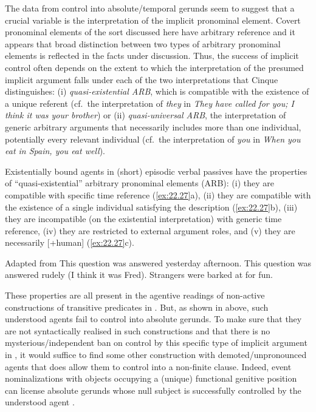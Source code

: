 \documentclass[output=paper]{langsci/langscibook}
\begin{document}
The data from control into absolute/temporal gerunds seem to suggest that a
crucial variable is the interpretation of the implicit pronominal element.
Covert pronominal elements of the sort discussed here have arbitrary reference
and it appears that  broad distinction between two types of
arbitrary pronominal elements is reflected in the facts under discussion. Thus,
the success of implicit control often depends on
the extent to which the interpretation of
the presumed implicit argument falls under each of the
two interpretations that Cinque distinguishes: (i) \emph{quasi-existential
ARB}, which is compatible with the existence of a unique referent (cf.\ the
interpretation of \emph{they} in \emph{They have called for you; I think it was
your brother}) or (ii) \emph{quasi-universal ARB}, the interpretation of
generic arbitrary arguments that necessarily includes more than one individual,
potentially every relevant individual (cf.\ the interpretation of \emph{you} in
\emph{When you eat in Spain, you eat well}).

Existentially bound agents in (short) episodic verbal passives have
the properties of  \enquote{quasi-existential}
arbitrary pronominal elements (ARB): (i) they are compatible with specific time
reference (\ref{ex:22.27}a), (ii) they are compatible with the existence of
a single individual satisfying the description (\ref{ex:22.27}b), (iii)
they are incompatible (on the existential interpretation) with generic time
reference, (iv) they are restricted to external argument roles, and (v) they
are necessarily [+human] (\ref{ex:22.27}c).

\ea%
    \label{ex:22.27} Adapted from \textcite{Roberts2014b}
    \ea This question was answered yesterday afternoon.
    \ex This question was answered rudely (I think it was Fred).
    \ex Strangers were barked at for fun.
    \z
\z

These properties are all present in the agentive readings of non-active
constructions of transitive predicates in . But, as shown in
 above, such understood agents fail to control into absolute
gerunds. To make sure that they are not syntactically realised in such
constructions and that there is no mysterious/independent ban on control by
this specific type of implicit argument in , it would suffice to find some
other construction with de\-mot\-ed/un\-pro\-nounced agents that does allow them to
control into a non-finite clause. Indeed, event nominalizations with objects
occupying a (unique) functional genitive position can license absolute gerunds
whose null subject is successfully controlled by the understood agent
.
\end{document}
